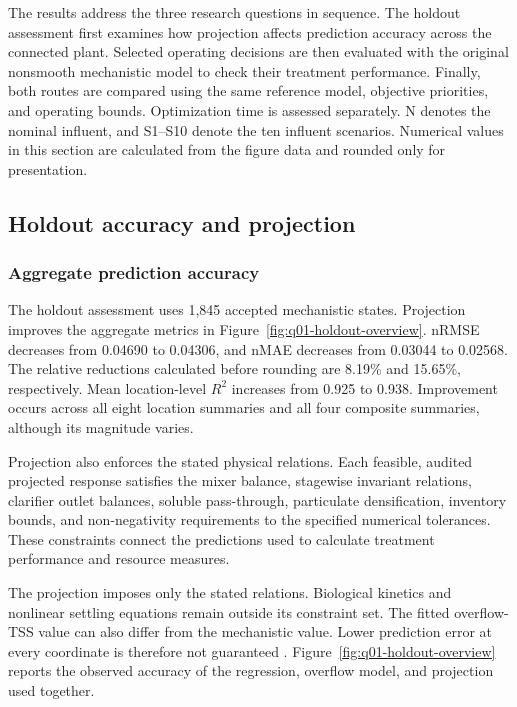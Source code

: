 \documentclass[a4paper,fleqn]{cas-sc}
\begin{document}
The results address the three research questions in sequence. The holdout assessment first examines how projection affects prediction accuracy across the connected plant. Selected operating decisions are then evaluated with the original nonsmooth mechanistic model to check their treatment performance. Finally, both routes are compared using the same reference model, objective priorities, and operating bounds. Optimization time is assessed separately. N denotes the nominal influent, and S1--S10 denote the ten influent scenarios. Numerical values in this section are calculated from the figure data and rounded only for presentation.

\subsection{Holdout accuracy and projection}
\label{sec:results-holdout}

\subsubsection{Aggregate prediction accuracy}
\label{sec:results-holdout-overview}

The holdout assessment uses 1,845 accepted mechanistic states. Projection improves the aggregate metrics in Figure~\ref{fig:q01-holdout-overview}. nRMSE decreases from 0.04690 to 0.04306, and nMAE decreases from 0.03044 to 0.02568. The relative reductions calculated before rounding are 8.19\% and 15.65\%, respectively. Mean location-level $R^2$ increases from 0.925 to 0.938. Improvement occurs across all eight location summaries and all four composite summaries, although its magnitude varies.

Projection also enforces the stated physical relations. Each feasible, audited projected response satisfies the mixer balance, stagewise invariant relations, clarifier outlet balances, soluble pass-through, particulate densification, inventory bounds, and non-negativity requirements to the specified numerical tolerances. These constraints connect the predictions used to calculate treatment performance and resource measures.

The projection imposes only the stated relations. Biological kinetics and nonlinear settling equations remain outside its constraint set. The fitted overflow-TSS value can also differ from the mechanistic value. Lower prediction error at every coordinate is therefore not guaranteed \citep{Selerio2026,SturmSilva2025}. Figure~\ref{fig:q01-holdout-overview} reports the observed accuracy of the regression, overflow model, and projection used together.
\end{document}
